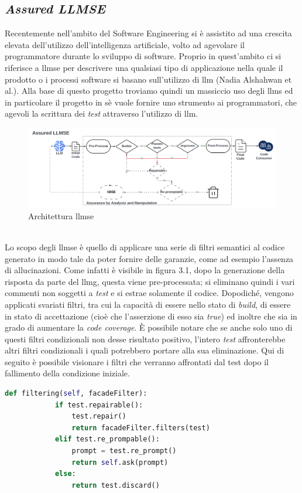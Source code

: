     \subsection{\textit{Assured LLMSE}}
    Recentemente nell'ambito del Software Engineering si è assistito ad una crescita elevata dell'utilizzo dell'intelligenza artificiale, volto ad agevolare il programmatore durante lo sviluppo di software.
    Proprio in quest'ambito ci si riferisce a \gls{llmse} per descrivere una qualsiasi tipo di applicazione nella quale il prodotto o i processi software si basano sull'utilizzo di \gls{llm} (Nadia Alshahwan et al.\cite{article:Alshahwan2024AssuredLS}).
    Alla base di questo progetto troviamo quindi un massiccio uso degli \glspl{llm} ed in particolare il progetto in sè vuole fornire uno strumento ai programmatori, che agevoli la scrittura dei \textit{test} attraverso l'utilizzo di \gls{llm}.
    \begin{figure}[!h]
        \centering        
        \includegraphics[width=14.5cm]{img/LLMSE.png}
        \caption{Architettura \gls{llmse}\cite{article:Alshahwan2024AssuredLS}}
    \end{figure}
  \\Lo scopo degli \gls{llmse} è quello di applicare una serie di filtri semantici al codice generato in modo tale da poter fornire delle garanzie, come ad esempio l'assenza di allucinazioni.
    Come infatti è visibile in figura 3.1, dopo la generazione della risposta da parte del \gls{llmg}, questa viene pre-processata; si eliminano quindi i vari commenti non soggetti a \textit{test} e si estrae solamente il codice.
    Dopodiché, vengono applicati svariati filtri, tra cui la capacità di essere nello stato di \textit{build}, di essere in stato di accettazione (cioè che l'asserzione di esso sia \textit{true}) ed inoltre che sia in grado di aumentare la \textit{code coverage}.
    È possibile notare che se anche solo uno di questi filtri condizionali non desse risultato positivo, l'intero \textit{test} affronterebbe altri filtri condizionali i quali potrebbero portare alla sua eliminazione.
    Qui di seguito è possibile visionare i filtri che verranno affrontati dal test dopo il fallimento della condizione iniziale.
    \begin{lstlisting}[language=Python]
        def filtering(self, facadeFilter):
            if test.repairable():
                test.repair()
                return facadeFilter.filters(test)
            elif test.re_prompable():
                prompt = test.re_prompt()
                return self.ask(prompt)
            else:
                return test.discard()
    \end{lstlisting}
    
